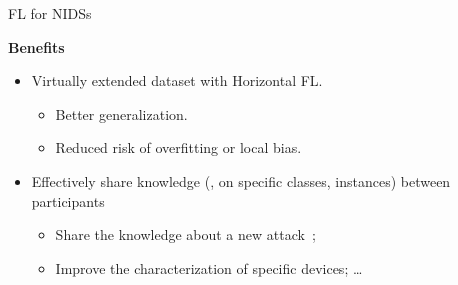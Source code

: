 \documentclass[aspectratio=169,10pt]{imta}
\begin{document}
\begin{frame}{FL for NIDSs}

  \textbf{Benefits}
  \begin{itemize}[<+->]
    \item Virtually extended dataset with Horizontal FL.
    \begin{itemize}[<1->]
      \item Better generalization.
      \item Reduced risk of overfitting or local bias.
    \end{itemize}
    

    \item Effectively share knowledge (\eg, on specific classes, instances) between participants
    \begin{itemize}[<1->]
      \item Share the knowledge about a new attack~\autocite{lavaur_icdcs_demo_2024};
      \item Improve the characterization of specific devices; \dots
    \end{itemize}


  \end{itemize}
\end{frame}
\end{document}
